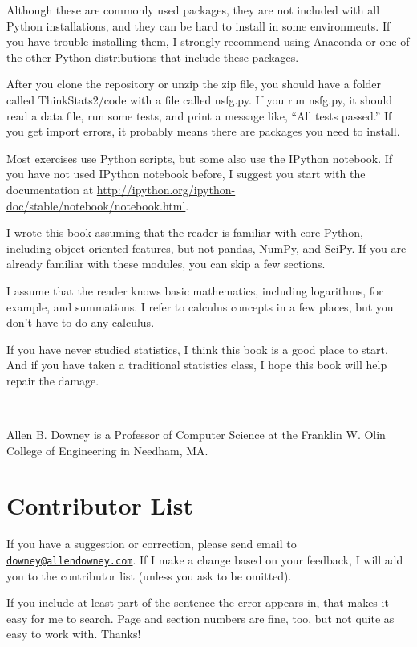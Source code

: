 \documentclass[]{book}
\begin{document}
Although these are commonly used packages, they are not included with
all Python installations, and they can be hard to install in some
environments. If you have trouble installing them, I strongly recommend
using Anaconda or one of the other Python distributions that include
these packages.

After you clone the repository or unzip the zip file, you should have a
folder called ThinkStats2/code with a file called
nsfg.py. If you run nsfg.py, it should read a data file, run some tests,
and print a message like, ``All tests passed.'' If you get import errors,
it probably means there are packages you need to install.

Most exercises use Python scripts, but some also use the IPython
notebook. If you have not used IPython notebook before, I suggest you
start with the documentation at \url{http://ipython.org/ipython-doc/stable/notebook/notebook.html}.

I wrote this book assuming that the reader is familiar with core Python,
including object-oriented features, but not pandas, NumPy, and SciPy. If
you are already familiar with these modules, you can skip a few
sections.

I assume that the reader knows basic mathematics, including logarithms,
for example, and summations. I refer to calculus concepts in a few
places, but you don't have to do any calculus.

If you have never studied statistics, I think this book is a good place
to start. And if you have taken a traditional statistics class, I hope
this book will help repair the damage.

---

Allen B. Downey is a Professor of Computer Science at the Franklin W.
Olin College of Engineering in Needham, MA.

\hypertarget{contributor-list}{%
\section{Contributor List}\label{contributor-list}}

If you have a suggestion or correction, please send email to \href{mailto:downey@allendowney.com}{\nolinkurl{downey@allendowney.com}}. If I make a
change based on your feedback, I will add you to the contributor list
(unless you ask to be omitted).

If you include at least part of the sentence the error appears in, that
makes it easy for me to search. Page and section numbers are fine, too,
but not quite as easy to work with. Thanks!
\end{document}
